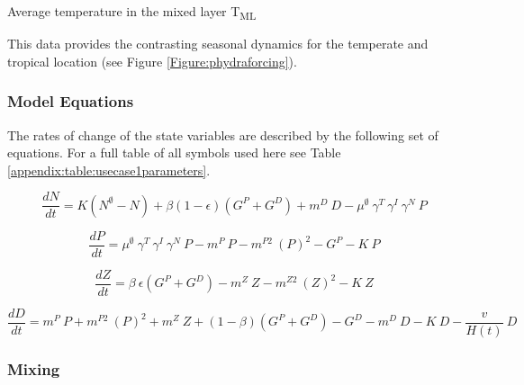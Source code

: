 \documentclass[template.tex]{subfiles}
\begin{document}
Average temperature in the mixed layer \unit{T_{ML}}

This data provides the contrasting seasonal dynamics for the temperate and tropical location (see Figure \ref{Figure:phydraforcing}).

\subsubsection{Model Equations}
The rates of change of the state variables are described by the following set of equations. For a full table of all symbols used here see Table \ref{appendix:table:usecase1parameters}.

\begin{equation}
    \frac{d N}{d t} = 
    K (N^\emptyset - N) %
    + \beta(1 - \epsilon)(G^P + G^D) %
    + m^D \ D %
    - \mu^{\emptyset} \ \gamma^{T} \ \gamma^{I} \ \gamma^{N} \ P %
\end{equation}

\begin{equation}
    \frac{d P}{d t} =
    \mu^{\emptyset} \ \gamma^{T} \ \gamma^{I} \ \gamma^{N} \ P  %
    - m^P \ P %
    - m^{P2} \ (P)^2 %
    - G^P %
    - K \ P %
\end{equation}

\begin{equation}
    \frac{d Z}{d t} =
    \beta \ \epsilon(G^P + G^D) %
    - m^Z \ Z %
    - m^{Z2} \ (Z)^2 %
    - K \ Z %
\end{equation}

\begin{equation}
    \frac{d D}{d t} = 
    m^P \ P %
    + m^{P2} \ (P)^2 %
    + m^Z \ Z %
    + (1 - \beta)(G^P + G^D) %
    - G^D %
    - m^D \ D %
    - K \ D %
    - \frac{v}{H(t)} \ D %
\end{equation}



\subsubsection{Mixing}
\end{document}

